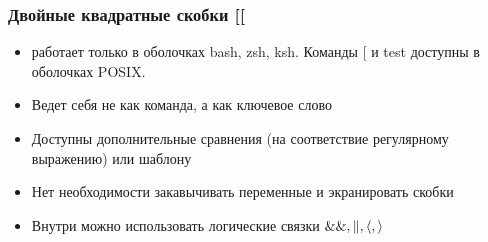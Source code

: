 \begin{frame}[fragile]
	\frametitle{Двойные квадратные скобки [[}

\begin{itemize}
        \item работает только в оболочках bash, zsh, ksh. Команды [ и test доступны в оболочках POSIX.
        \item Ведет себя не как команда, а как ключевое слово
        \item Доступны дополнительные сравнения (на соответствие регулярному выражению) или шаблону
        \item Нет необходимости закавычивать переменные и экранировать скобки \(\)
        \item Внутри можно использовать логические связки \({\tt \&\&, \|, \langle, \rangle}\)
\end{itemize}

\end{frame}

